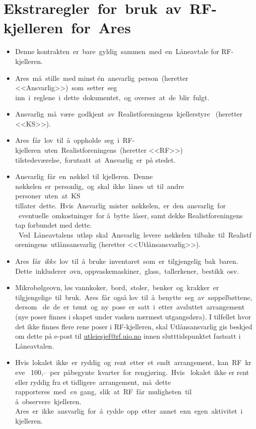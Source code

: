 \documentclass[a4paper,10pt]{article}
\author{Alexander Fleischer}
\begin{document}
 
\section*{Ekstraregler for bruk av RF-kjelleren for Ares}

\raggedright
\begin{itemize}
    \item Denne kontrakten er bare gyldig sammen med en Låneavtale for RF-kjelleren.
\item Ares må stille med minst én ansvarlig person (heretter <<Ansvarlig>>) som setter seg 
    inn i reglene i dette dokumentet, og overser at de blir fulgt.
\item Ansvarlig må være godkjent av Realistforeningens kjellerstyre 
    (heretter <<KS>>).
\item Ares får lov til å oppholde seg i RF-kjelleren uten Realistforeningens (heretter <<RF>>) 
    tilstedeværelse, forutsatt at Ansvarlig er på stedet.
\item Ansvarlig får en nøkkel til kjelleren. Denne 
    nøkkelen er personlig, og skal ikke lånes ut til andre personer uten at KS 
    tillater dette. Hvis Ansvarlig mister nøkkelen, er den ansvarlig for
     eventuelle omkostninger for å bytte låser, samt dekke Realistforeningens tap forbundet med dette.
     Ved Låneavtalens utløp skal Ansvarlig levere nøkkelen tilbake til Realistforeningens utlånsansvarlig (heretter <<Utlånsansvarlig>>).
\item Ares får \textit{ikke} lov til å bruke inventaret som er tilgjengelig bak baren. 
    Dette inkluderer ovn, oppvaskemaskiner, glass, tallerkener, bestikk osv.
\item Mikrobølgeovn, løs vannkoker, bord, stoler, benker og krakker er 
    tilgjengelige til bruk. Ares får også lov til å benytte seg av søppelbøttene, dersom
     de de er tømt og ny pose er satt i etter avsluttet arrangement (nye poser finnes i skapet under vasken nærmest utgangsdøra).
    I tilfellet hvor det ikke finnes flere rene poser i RF-kjelleren, skal Utlånsansvarlig gis beskjed om dette
    på e-post til \url{utleiesjef@rf.uio.no} innen slutttidspunktet fastsatt i Låneavtalen.
\item Hvis lokalet ikke er ryddig og rent etter et endt arrangement, kan RF kreve
     100,-- per påbegynte kvarter for rengjøring. Hvis 
    lokalet ikke er rent eller ryddig fra et tidligere arrangement, må dette 
    rapporteres med \textit{en} gang, slik at RF får muligheten til å observere kjelleren. 
    Ares er ikke ansvarlig for å rydde opp etter annet enn egen aktivitet i 
    kjelleren. 
    

\end{itemize}
\end{document}
